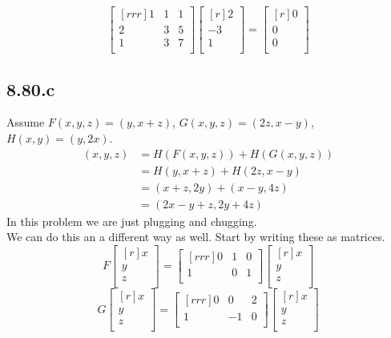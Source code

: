 \documentclass{report}
\theoremstyle{plain}
\theoremstyle{definition}
\theoremstyle{plain}
\begin{document}
\[ \begin{bmatrix}[rrr]1&1&1\\2&3&5\\1&3&7\\\end{bmatrix}\begin{bmatrix}[r]2\\-3\\1\\\end{bmatrix} = \begin{bmatrix}[r]0\\0\\0\\\end{bmatrix} \]

\subsection{8.80.c}
Assume $F(x,y,z)=(y,x+z)$, $G(x,y,z)=(2z,x-y)$, $H(x,y)=(y,2x)$.\\
\begin{align*}
[H \circ (F+G)](x,y,z) &= H(F(x,y,z))+H(G(x,y,z))\\
&= H(y,x+z)+H(2z,x-y)\\
&= (x+z,2y)+(x-y,4z)\\
&= (2x-y+z,2y+4z)
\end{align*}
In this problem we are just plugging and chugging.\\
We can do this an a different way as well. Start by writing these as matrices.
\[ F\begin{bmatrix}[r]x\\y\\z\\\end{bmatrix}=\begin{bmatrix}[rrr]0&1&0\\1&0&1\\\end{bmatrix}\begin{bmatrix}[r]x\\y\\z\\\end{bmatrix}\]
\[ G\begin{bmatrix}[r]x\\y\\z\\\end{bmatrix}=\begin{bmatrix}[rrr]0&0&2\\1&-1&0\\\end{bmatrix}\begin{bmatrix}[r]x\\y\\z\\\end{bmatrix}\]
\end{document}
